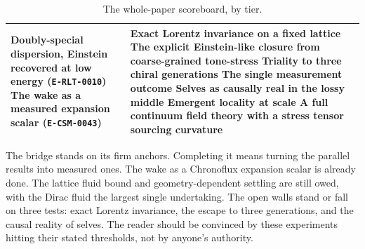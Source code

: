 \begin{table}[h]
\begin{tabularx}{\textwidth}{@{}>{\raggedright\arraybackslash}X >{\raggedright\arraybackslash}X >{\raggedright\arraybackslash}X@{}}
Doubly-special dispersion, Einstein recovered at low energy (\texttt{E-RLT-0010})
\newline\newline
The wake as a measured expansion scalar (\texttt{E-CSM-0043})
&
Exact Lorentz invariance on a fixed lattice \cite{bombelli1987, thooft2016}
\newline\newline
The explicit Einstein-like closure from coarse-grained tone-stress
\newline\newline
Triality to three chiral generations \cite{distler2010, boyle2020}
\newline\newline
The single measurement outcome
\newline\newline
Selves as causally real in the lossy middle
\newline\newline
Emergent locality at scale
\newline\newline
A full continuum field theory with a stress tensor sourcing curvature
\\
\bottomrule
\end{tabularx}
\caption{The whole-paper scoreboard, by tier.}
\end{table}

The bridge stands on its firm anchors. Completing it means turning the parallel results into measured ones. The wake as a
Chronoflux expansion scalar is already done. The lattice fluid bound and geometry-dependent settling are still owed, with the
Dirac fluid the largest single undertaking. The open walls stand or fall on three tests: exact Lorentz invariance, the escape
to three generations, and the causal reality of selves. The reader should be convinced by these experiments hitting their
stated thresholds, not by anyone's authority.
